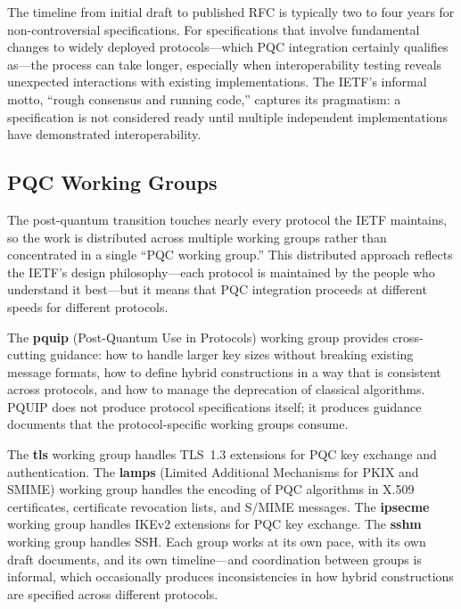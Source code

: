 The timeline from initial draft to published RFC is typically two to four years for non-controversial specifications. For specifications that involve fundamental changes to widely deployed protocols---which PQC integration certainly qualifies as---the process can take longer, especially when interoperability testing reveals unexpected interactions with existing implementations. The IETF's informal motto, ``rough consensus and running code,'' captures its pragmatism: a specification is not considered ready until multiple independent implementations have demonstrated interoperability.

\subsection{PQC Working Groups}
\label{subsec:pqc-working-groups}

The post-quantum transition touches nearly every protocol the IETF maintains, so the work is distributed across multiple working groups rather than concentrated in a single ``PQC working group.'' This distributed approach reflects the IETF's design philosophy---each protocol is maintained by the people who understand it best---but it means that PQC integration proceeds at different speeds for different protocols.

The \textbf{pquip} (Post-Quantum Use in Protocols) working group provides cross-cutting guidance: how to handle larger key sizes without breaking existing message formats, how to define hybrid constructions in a way that is consistent across protocols, and how to manage the deprecation of classical algorithms. PQUIP does not produce protocol specifications itself; it produces guidance documents that the protocol-specific working groups consume.

The \textbf{tls} working group handles TLS~1.3 extensions for PQC key exchange and authentication. The \textbf{lamps} (Limited Additional Mechanisms for PKIX and SMIME) working group handles the encoding of PQC algorithms in X.509 certificates, certificate revocation lists, and S/MIME messages. The \textbf{ipsecme} working group handles IKEv2 extensions for PQC key exchange. The \textbf{sshm} working group handles SSH. Each group works at its own pace, with its own draft documents, and its own timeline---and coordination between groups is informal, which occasionally produces inconsistencies in how hybrid constructions are specified across different protocols.

